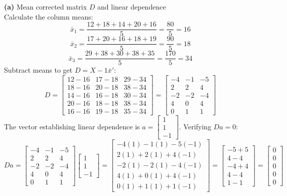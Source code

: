 \documentclass{article}
\begin{document}
\noindent \textbf{(a)} Mean corrected matrix $D$ and linear dependence \\
Calculate the column means:
\[
\bar{x}_1 = \frac{12+18+14+20+16}{5} = \frac{80}{5} = 16
\]
\[
\bar{x}_2 = \frac{17+20+16+18+19}{5} = \frac{90}{5} = 18
\]
\[
\bar{x}_3 = \frac{29+38+30+38+35}{5} = \frac{170}{5} = 34
\]
Subtract means to get $D = X - 1\bar{x}'$:
\[
D = \begin{bmatrix} 12-16 & 17-18 & 29-34 \\ 18-16 & 20-18 & 38-34 \\ 14-16 & 16-18 & 30-34 \\ 20-16 & 18-18 & 38-34 \\ 16-16 & 19-18 & 35-34 \end{bmatrix} = \begin{bmatrix} -4 & -1 & -5 \\ 2 & 2 & 4 \\ -2 & -2 & -4 \\ 4 & 0 & 4 \\ 0 & 1 & 1 \end{bmatrix}
\]
The vector establishing linear dependence is $a = \begin{bmatrix} 1 \\ 1 \\ -1 \end{bmatrix}$. Verifying $Da = 0$:
\[
Da = \begin{bmatrix} -4 & -1 & -5 \\ 2 & 2 & 4 \\ -2 & -2 & -4 \\ 4 & 0 & 4 \\ 0 & 1 & 1 \end{bmatrix} \begin{bmatrix} 1 \\ 1 \\ -1 \end{bmatrix} = \begin{bmatrix} -4(1) - 1(1) - 5(-1) \\ 2(1) + 2(1) + 4(-1) \\ -2(1) - 2(1) - 4(-1) \\ 4(1) + 0(1) + 4(-1) \\ 0(1) + 1(1) + 1(-1) \end{bmatrix} = \begin{bmatrix} -5+5 \\ 4-4 \\ -4+4 \\ 4-4 \\ 1-1 \end{bmatrix} = \begin{bmatrix} 0 \\ 0 \\ 0 \\ 0 \\ 0 \end{bmatrix}
\]
\end{document}
